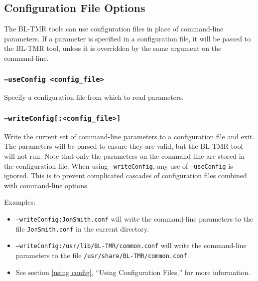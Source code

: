 \subsection{Configuration File Options}
\label{config options}
The BL-TMR tools can use configuration files in place of command-line parameters. 
If a parameter is specified in a configuration file, it will be passed to the 
BL-TMR tool, unless it is overridden by the same argument on the command-line. 

\subsubsection{\texttt{--useConfig <config\_file>}}
\label{useConfig}
Specify a configuration file from which to read parameters.

\subsubsection{\texttt{--writeConfig[:<config\_file>]}}
Write the current set of command-line parameters to a configuration file and 
exit. The parameters will be parsed to ensure they are valid, but the BL-TMR tool
will not run.  Note that only the parameters on the command-line are stored in
the configuration file. When using \texttt{--writeConfig}, any use of
\texttt{--useConfig} is ignored. This is to prevent complicated cascades
of configuration files combined with command-line options.

Examples:
\begin{itemize}
  \item \texttt{--writeConfig:JonSmith.conf} will write the command-line 
  parameters to the file \texttt{JonSmith.conf} in the current directory.
  \item \texttt{--writeConfig:/usr/lib/BL-TMR/common.conf} will write the
  command-line parameters to the file \texttt{/usr/share/BL-TMR/common.conf}. 
  \item See section \ref{using config}, ``Using Configuration Files,'' for
  more information.
\end{itemize}

